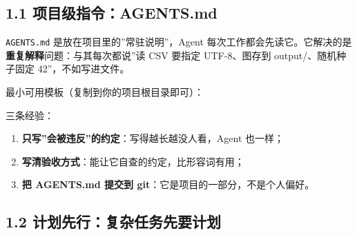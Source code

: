 \subsection{1.1
项目级指令：AGENTS.md}\label{ux9879ux76eeux7ea7ux6307ux4ee4agents.md}

\texttt{AGENTS.md} 是放在项目里的''常驻说明''，Agent
每次工作都会先读它。它解决的是\textbf{重复解释}问题：与其每次都说''读
CSV 要指定 UTF-8、图存到 output/、随机种子固定 42''，不如写进文件。

最小可用模板（复制到你的项目根目录即可）：

\begin{Shaded}
\begin{Highlighting}[]



\end{Highlighting}
\end{Shaded}

三条经验：

\begin{enumerate}
\def\labelenumi{\arabic{enumi}.}
\tightlist
\item
  \textbf{只写''会被违反''的约定}：写得越长越没人看，Agent 也一样；
\item
  \textbf{写清验收方式}：能让它自查的约定，比形容词有用；
\item
  \textbf{把 AGENTS.md 提交到 git}：它是项目的一部分，不是个人偏好。
\end{enumerate}

\subsection{1.2
计划先行：复杂任务先要计划}\label{ux8ba1ux5212ux5148ux884cux590dux6742ux4efbux52a1ux5148ux8981ux8ba1ux5212}

